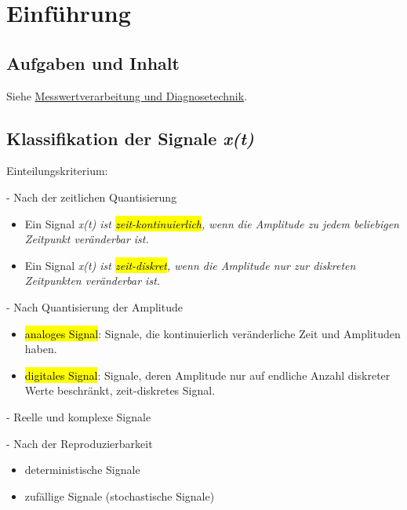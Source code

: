 \section{Einführung}
{}
\subsection{\textbf{Aufgaben und Inhalt}}
Siehe \href{run:Bilder/ Referenzen/ Mitschrift-MWV-SS2021-Handout.pdf}{Messwertverarbeitung und Diagnosetechnik}.
\subsection{\textbf{Klassifikation der Signale {\itshape x(t)}}}
Einteilungskriterium:\par
\hspace{1em} - Nach der zeitlichen Quantisierung\par
\begin{itemize}[topsep=2pt]
     \item
     Ein Signal \itshape x(t) ist \hl{zeit-kontinuierlich}, wenn die Amplitude zu jedem beliebigen Zeitpunkt veränderbar ist.
     \item
     Ein Signal \itshape x(t) ist \hl{zeit-diskret}, wenn die Amplitude nur zur diskreten Zeitpunkten veränderbar ist.
\end{itemize}

\hspace{1em} - Nach Quantisierung der Amplitude
\begin{itemize}[topsep=2pt]
     \item
     \hl{analoges Signal}: Signale, die kontinuierlich veränderliche Zeit und Amplituden haben.
     \item
     \hl{digitales Signal}: Signale, deren Amplitude nur auf endliche Anzahl diskreter Werte beschränkt, zeit-diskretes Signal.
\end{itemize}

\hspace{1em} - Reelle und komplexe Signale\par
\hspace{1em} - Nach der Reproduzierbarkeit\par
\begin{itemize}[topsep=2pt]
    \item 
    deterministische Signale
    \item
    zufällige Signale (stochastische Signale)
\end{itemize}

